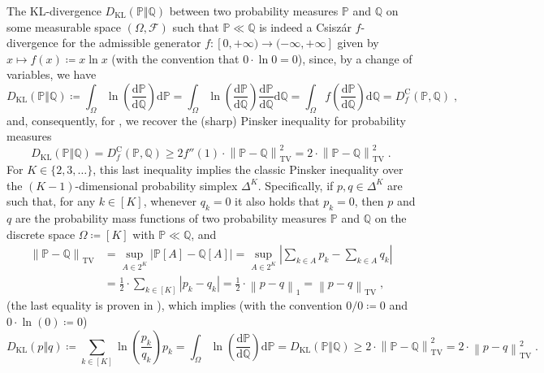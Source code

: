 \documentclass[11pt,oneside,a4paper]{article}
\newcommand{\cF}{\mathcal{F}}
\newcommand{\Pb}{\mathbb{P}}
\newcommand{\Q}{\mathbb{Q}}
\newcommand{\lrb}[1]{\left(#1\right)}
\newcommand{\labs}[1]{\left\lvert#1\right\rvert}
\newcommand{\babs}[1]{\bigl\lvert#1\bigr\rvert}
\newcommand{\lno}[1]{\left\lVert#1\right\rVert}
\newcommand{\dif}{\mathrm{d}}
\theoremstyle{plain}
\theoremstyle{definition}
\theoremstyle{remark}
\newcommand{\simplex}[1]{\Delta^{#1}}
\newcommand{\KL}{D_{\mathrm{KL}}}
\newcommand{\TV}[2]{\lno{ #1 - #2 }_{\textrm{TV}} }
\begin{document}
{The KL-divergence $\KL(\Pb\Vert \Q)$ between two probability measures $\Pb$ and $\Q$ on some measurable space $(\Omega,\cF)$ such that $\Pb\ll\Q$ is indeed a Csisz\'ar $f$-divergence for the admissible generator $f \colon [0,+\infty) \to (-\infty,+\infty]$ given by $x \mapsto f(x)\coloneq x \ln x$ (with the convention that $0 \cdot \ln0 = 0$), since, by a change of variables, we have
\[
    \KL(\Pb\Vert \Q)
\coloneqq
    \int_{\Omega} \ln \lrb{\frac{\dif \Pb}{\dif \Q}} \dif \Pb
=
    \int_{\Omega} \ln \lrb{\frac{\dif \Pb}{\dif \Q}} \frac{\dif \Pb}{\dif \Q} \dif \Q
=
    \int_{\Omega} f\lrb{\frac{\dif \Pb}{\dif \Q}} \dif \Q
=
D_f^{\textrm{C}}(\Pb,\Q)\;,
\]
and, consequently, for , we recover the (sharp) Pinsker inequality for probability measures
\[
    \KL(\Pb\Vert \Q)
=
    D_f^{\textrm{C}}(\Pb,\Q)
\ge
    2 f''(1) \cdot \TV{\Pb}{\Q}^2 
=
    2 \cdot \TV{\Pb}{\Q}^2\;.
\]
For $K \in \{2,3,\dots\}$, this last inequality implies the classic Pinsker inequality over the $(K-1)$-dimensional probability simplex $\simplex{K}$.
Specifically, if $p,q \in \simplex{K}$ are such that, for any $k \in [K]$, whenever $q_k = 0$ it also holds that $p_k = 0$, then $p$ and $q$ are the probability mass functions of two probability measures $\Pb$ and $\Q$ on the discrete space $\Omega \coloneqq [K]$ with $\Pb\ll\Q$, and
\begin{align*}
    \TV{\Pb}{\Q}
&=
    \sup_{A \in 2^K} \babs{\Pb[A]-\Q[A]}
=
    \sup_{A \in 2^K} \labs{\sum_{k\in A}p_k-\sum_{k\in A}q_k}
\\
&=
    \frac{1}{2} \cdot \sum_{k \in [K]}|p_k-q_k|
=
    \frac{1}{2}\cdot \lno{p-q}_1
=
    \TV{p}{q}\;,
\end{align*}
(the last equality is proven in ), which implies (with the convention $0/0 \coloneqq 0$ and $0 \cdot \ln(0) \coloneqq 0$)
\[
    \KL(p\Vert q)
\coloneqq
    \sum_{k \in [K]} \ln\lrb{\frac{p_k}{q_k}}p_k
=
    \int_{\Omega} \ln\lrb{\frac{\dif \Pb}{ \dif \Q}} \dif\Pb
=
    \KL(\Pb \Vert \Q)
\ge
    2 \cdot\TV{\Pb}{\Q}^2
=
    2 \cdot\TV{p}{q}^2\;.
\]

}
\end{document}
